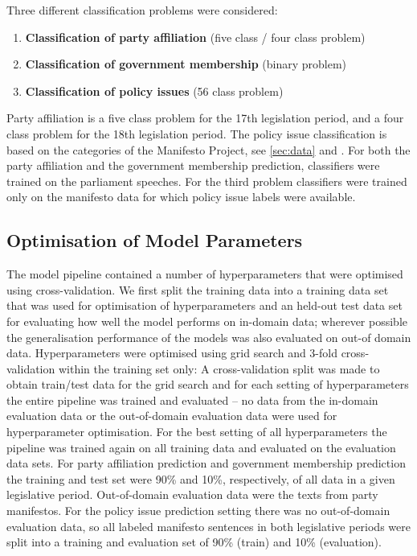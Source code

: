\documentclass{article}
\begin{document}
Three different classification problems were considered:
\begin{enumerate}
\item {\bf Classification of party affiliation} (five class / four class problem)
\item {\bf Classification of government membership} (binary problem)
\item {\bf Classification of policy issues} (56 class problem)
\end{enumerate}

Party affiliation is a five class problem for the 17th legislation period, and a four class problem for the 18th legislation period. The policy issue classification is based on the categories of the Manifesto Project, see \autoref{sec:data} and \cite{leftright}.
For both the party affiliation and the government membership prediction, classifiers were trained on the parliament speeches. For the third problem classifiers were trained only on the manifesto data for which policy issue labels were available.

\subsection{Optimisation of Model Parameters}\label{sec:crossvalidation}
The model pipeline contained a number of  hyperparameters that were optimised using cross-validation.
We first split the training data into a training data set that was used for optimisation of hyperparameters and an held-out test data set for evaluating how well the model performs on in-domain data; wherever possible the generalisation performance of the models was also evaluated on out-of domain data. Hyperparameters were optimised using grid search and 3-fold cross-validation within the training set only: A cross-validation split was made to obtain train/test data for the grid search and for each setting of hyperparameters the entire pipeline was trained and evaluated -- no data from the in-domain evaluation data or the out-of-domain evaluation data were used for hyperparameter optimisation. For the best setting of all hyperparameters the pipeline was trained again on all training data and evaluated on the evaluation data sets. For party affiliation prediction and government membership prediction the training and test set were 90\% and 10\%, respectively, of all data in a given legislative period. Out-of-domain evaluation data were the texts from party manifestos. For the policy issue prediction setting there was no out-of-domain evaluation data, so all labeled manifesto sentences in both legislative periods were split into a training and evaluation set of 90\% (train) and 10\% (evaluation).
\end{document}
